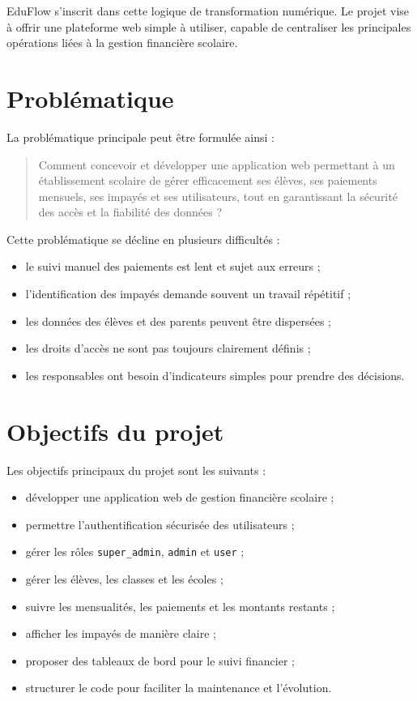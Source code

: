 \documentclass[12pt,a4paper]{report}
\begin{document}
EduFlow s'inscrit dans cette logique de transformation numérique. Le projet vise à offrir une plateforme web simple à utiliser, capable de centraliser les principales opérations liées à la gestion financière scolaire.

\section{Problématique}

La problématique principale peut être formulée ainsi :

\begin{quote}
Comment concevoir et développer une application web permettant à un établissement scolaire de gérer efficacement ses élèves, ses paiements mensuels, ses impayés et ses utilisateurs, tout en garantissant la sécurité des accès et la fiabilité des données ?
\end{quote}

Cette problématique se décline en plusieurs difficultés :

\begin{itemize}[label=--]
    \item le suivi manuel des paiements est lent et sujet aux erreurs ;
    \item l'identification des impayés demande souvent un travail répétitif ;
    \item les données des élèves et des parents peuvent être dispersées ;
    \item les droits d'accès ne sont pas toujours clairement définis ;
    \item les responsables ont besoin d'indicateurs simples pour prendre des décisions.
\end{itemize}

\section{Objectifs du projet}

Les objectifs principaux du projet sont les suivants :

\begin{itemize}[label=--]
    \item développer une application web de gestion financière scolaire ;
    \item permettre l'authentification sécurisée des utilisateurs ;
    \item gérer les rôles \texttt{super\_admin}, \texttt{admin} et \texttt{user} ;
    \item gérer les élèves, les classes et les écoles ;
    \item suivre les mensualités, les paiements et les montants restants ;
    \item afficher les impayés de manière claire ;
    \item proposer des tableaux de bord pour le suivi financier ;
    \item structurer le code pour faciliter la maintenance et l'évolution.
\end{itemize}
\end{document}

